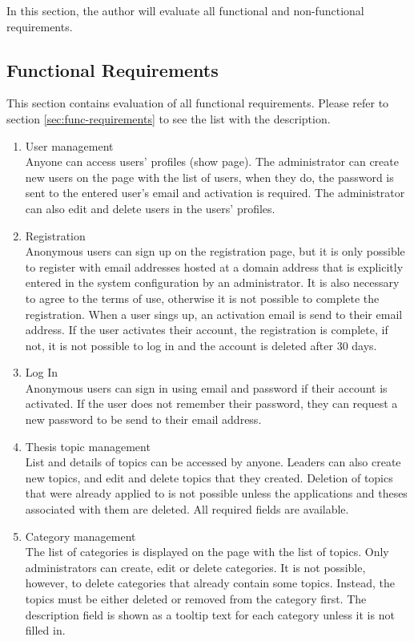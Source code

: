 In this section, the author will evaluate all functional and non-functional requirements.

\subsection{Functional Requirements}
\label{sec:eval-func-requirements}

This section contains evaluation of all functional requirements. Please refer to section \ref{sec:func-requirements} to see the list with the description.

\begin{enumerate}
    \item User management\\
    Anyone can access users' profiles (show page). The administrator can create new users on the page with the list of users, when they do, the password is sent to the entered user's email and activation is required. The administrator can also edit and delete users in the users' profiles.

    \item Registration\\
    Anonymous users can sign up on the registration page, but it is only possible to register with email addresses hosted at a domain address that is explicitly entered in the system configuration by an administrator. It is also necessary to agree to the terms of use, otherwise it is not possible to complete the registration. When a user sings up, an activation email is send to their email address. If the user activates their account, the registration is complete, if not, it is not possible to log in and the account is deleted after 30 days.

    \item Log In\\
    Anonymous users can sign in using email and password if their account is activated. If the user does not remember their password, they can request a new password to be send to their email address.

    \item Thesis topic management\\
    List and details of topics can be accessed by anyone. Leaders can also create new topics, and edit and delete topics that they created. Deletion of topics that were already applied to is not possible unless the applications and theses associated with them are deleted. All required fields are available.

    \item Category management\\
    The list of categories is displayed on the page with the list of topics. Only administrators can create, edit or delete categories. It is not possible, however, to delete categories that already contain some topics. Instead, the topics must be either deleted or removed from the category first. The description field is shown as a tooltip text for each category unless it is not filled in. 


\end{enumerate}
